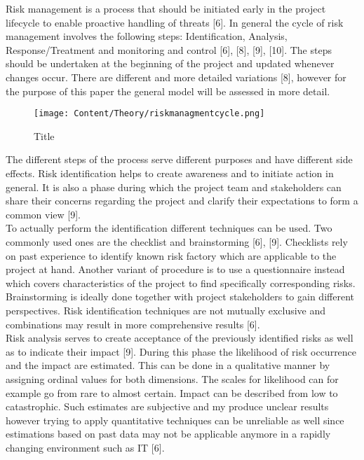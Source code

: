 Risk management is a process that should be initiated early in the project lifecycle to enable proactive handling of threats [6]. In general the cycle of risk management involves the following steps: Identification, Analysis, Response/Treatment and monitoring and control [6], [8], [9], [10]. The steps should be undertaken at the beginning of the project and updated whenever changes occur. There are different and more detailed variations [8], however for the purpose of this paper the general model will be assessed in more detail. \\
\begin{figure}[htbp] 
	\centering
	\texttt{[image: Content/Theory/riskmanagmentcycle.png]}
	\caption{Title}
	\cite{bibkey}
	\label{fig:riskmanagmentcycle}
\end{figure}
The different steps of the process serve different purposes and have different side effects. Risk identification helps to create awareness and to initiate action in general. It is also a phase during which the project team and stakeholders can share their concerns regarding the project and clarify their expectations to form a common view [9].\\

To actually perform the identification different techniques can be used. Two commonly used ones are the checklist and brainstorming [6], [9]. Checklists rely on past experience to identify known risk factory which are applicable to the project at hand. Another variant of procedure is to use a questionnaire instead which covers characteristics of the project to find specifically corresponding risks. Brainstorming is ideally done together with project stakeholders to gain different perspectives. Risk identification techniques are not mutually exclusive and combinations may result in more comprehensive results [6].\\

Risk analysis serves to create acceptance of the previously identified risks as well as to indicate their impact [9]. During this phase the likelihood of risk occurrence and the impact are estimated. This can be done in a qualitative manner by assigning ordinal values for both dimensions. The scales for likelihood can for example go from rare to almost certain. Impact can be described from low to catastrophic. Such estimates are subjective and my produce unclear results however trying to apply quantitative techniques can be unreliable as well since estimations based on past data may not be applicable anymore in a rapidly changing environment such as IT [6].\\

